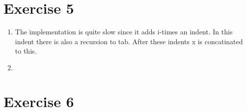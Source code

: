 \documentclass{article}
\begin{document}
\section*{Exercise 5}
\begin{enumerate}
  \item The implementation is quite slow since it adds i-times an indent. In this indent there is also a recursion to tab.  After these indents x is concatinated to this.
  \item
\end{enumerate}

\section*{Exercise 6}
\end{document}
